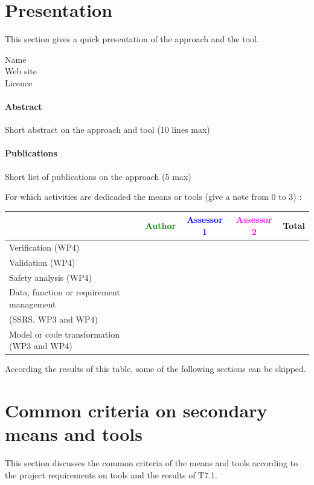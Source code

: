 \section{Presentation}

This section gives a quick presentation of the approach and the tool.

\begin{description}
\item[Name] 
\item[Web site] 
\item[Licence] 
\end{description}

\paragraph{Abstract} Short abstract on the approach and tool (10 lines max)

\paragraph{Publications} Short list of publications on the approach (5 max)


For which activities are dedicaded the means or tools (give a note from 0 to  3) :

\begin{tabular}{|l | c | c | c | c|}
\hline
& \textcolor{green}{Author} & \textcolor{blue}{Assessor 1} & \textcolor{magenta}{Assessor 2} & Total \\
\hline 
Verification (WP4) & & & &  \\
\hline
Validation (WP4) & & & & \\
\hline
Safety analysis (WP4) & & & & \\
\hline
Data, function or requirement management & & & & \\
(SSRS, WP3 and WP4) & & & & \\
\hline
Model or code transformation (WP3 and WP4) & & & & \\
\hline
\end{tabular}

According the results of this table, some of the following sections can be skipped.

\section{Common criteria on secondary means and tools}
\label{common}
This section discusses the common criteria of the means and tools according to the project requirements on tools and the results of T7.1.

